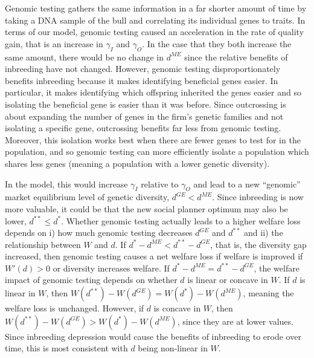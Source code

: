 \documentclass[12pt,letterpaper]{article}
\begin{document}
Genomic testing gathers the same information in a far shorter amount of time by taking a DNA sample of the bull and correlating its individual genes to traits.
In terms of our model, genomic testing caused an acceleration in the rate of quality gain, that is an increase in $\gamma_I$ and $\gamma_O$.
In the case that they both increase the same amount, there would be no change in $d^{ME}$ since the relative benefits of inbreeding have not changed.
However, genomic testing disproportionately benefits inbreeding because it makes identifying beneficial genes easier.
In particular, it makes identifying which offspring inherited the genes easier and so isolating the beneficial gene is easier than it was before.
Since outcrossing is about expanding the number of genes in the firm's genetic families and not isolating a specific gene, outcrossing benefits far less from genomic testing.
Moreover, this isolation works best when there are fewer genes to test for in the population, and so genomic testing can more efficiently isolate a population which shares less genes (meaning a population with a lower genetic diversity).

In the model, this would increase $\gamma_I$ relative to $\gamma_O$ and lead to a new ``genomic'' market equilibrium level of genetic diversity, $d^{GE}<d^{ME}$.
Since inbreeding is now more valuable, it could be that the new social planner optimum may also be lower, $d^{**}\leq d^*$.
Whether genomic testing actually leads to a higher welfare loss depends on i) how much genomic testing decreases $d^{GE}$ and $d^{**}$ and ii) the relationship between $W$ and $d$.
If $d^* - d^{ME} < d^{**} -d^{GE}$, that is, the diversity gap increased, then genomic testing causes a net welfare loss if welfare is improved if $W'(d)>0$ or diversity increases welfare.
If $d^* - d^{ME} = d^{**} -d^{GE}$, the welfare impact of genomic testing depends on whether $d$ is linear or concave in $W$.
If $d$ is linear in $W$, then $W(d^{**}) - W(d^{GE}) = W(d^{*})-W(d^{ME})$, meaning the welfare loss is unchanged.
However, if $d$ is concave in $W$, then $W(d^{**}) - W(d^{GE}) > W(d^{*})-W(d^{ME})$, since they are at lower values.
Since inbreeding depression would cause the benefits of inbreeding to erode over time, this is most consistent with $d$ being non-linear in $W$.
\end{document}
